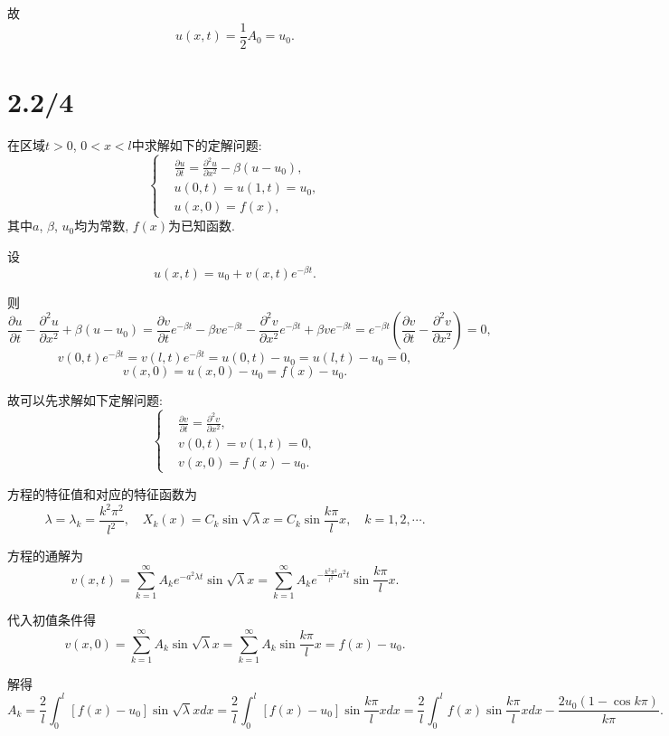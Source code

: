 \documentclass[11pt,a4paper]{article}
\begin{document}
故
$$u(x,t)=\frac{1}{2}A_0=u_0.$$

\section{2.2/4}
\begin{problem}
在区域$t>0$, $0<x<l$中求解如下的定解问题:
$$\left\{\begin{aligned}
     & \frac{\partial u}{\partial t}=\frac{\partial^2u}{\partial x^2}-\beta(u-u_0), \\
     & u(0,t) = u(1,t)=u_0,                                                         \\
     & u(x,0)=f(x),
  \end{aligned}\right.$$
其中$a$, $\beta$, $u_0$均为常数, $f(x)$为已知函数.
\end{problem}

设
$$u(x,t)=u_0+v(x,t)e^{-\beta t}.$$

则
$$\frac{\partial u}{\partial t}-\frac{\partial^2u}{\partial x^2}+\beta(u-u_0)=\frac{\partial v}{\partial t}e^{-\beta t}-\beta ve^{-\beta t}-\frac{\partial^2v}{\partial x^2}e^{-\beta t}+\beta ve^{-\beta t}=e^{-\beta t}\left(\frac{\partial v}{\partial t}-\frac{\partial^2v}{\partial x^2}\right)=0,$$
$$v(0,t)e^{-\beta t}=v(l,t)e^{-\beta t}=u(0,t)-u_0=u(l,t)-u_0=0,$$
$$v(x,0)=u(x,0)-u_0=f(x)-u_0.$$

故可以先求解如下定解问题:
$$\left\{\begin{aligned}
     & \frac{\partial v}{\partial t}=\frac{\partial^2v}{\partial x^2}, \\
     & v(0,t) = v(1,t)=0,                                              \\
     & v(x,0)=f(x)-u_0.
  \end{aligned}\right.$$

方程的特征值和对应的特征函数为
$$\lambda=\lambda_k=\frac{k^2\pi^2}{l^2},\quad X_k(x)=C_k\sin\sqrt{\lambda}x=C_k\sin\frac{k\pi}{l} x,\quad k=1,2,\cdots.$$

方程的通解为
$$v(x,t)=\sum_{k=1}^\infty A_ke^{-a^2\lambda t}\sin\sqrt{\lambda}x=\sum_{k=1}^\infty A_ke^{-\frac{k^2\pi^2}{l^2}a^2t}\sin \frac{k\pi}{l} x.$$

代入初值条件得
$$v(x,0)=\sum_{k=1}^\infty A_k\sin\sqrt{\lambda}x=\sum_{k=1}^\infty A_k\sin \frac{k\pi}{l} x=f(x)-u_0.$$

解得
$$A_k=\frac{2}{l}\int_0^l [f(x)-u_0]\sin\sqrt{\lambda}xdx=\frac{2}{l}\int_0^l [f(x)-u_0]\sin \frac{k\pi}{l} xdx
  =\frac{2}{l}\int_0^l f(x)\sin \frac{k\pi}{l} xdx-\frac{2u_0(1-\cos k\pi)}{k\pi}.$$
\end{document}
